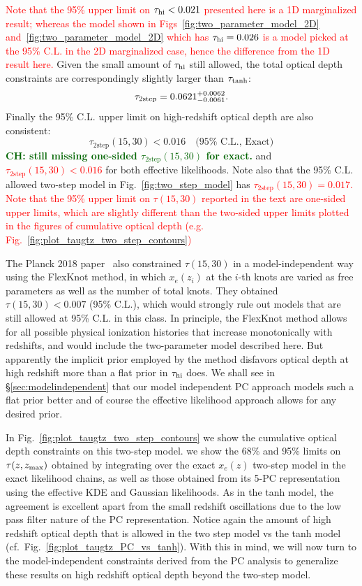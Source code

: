 \documentclass[prd,twocolumn,amsmath,amssymb,floatfix,superscriptaddress,nofootinbib]{revtex4-1}
\newcommand{\zmax}{z_{\rm max}}
\newcommand{\tauhi}{\tau_{\rm hi}}
\newcommand{\beq}{\begin{equation}}
\newcommand{\eeq}{\end{equation}}
\newcommand{\ch}[1]{\textcolor{red}{#1}}
\newcommand{\todo}[1]{\textcolor{darkgreen}{\bf{#1}}}
\begin{document}
\ch{Note that the 95\% upper limit on $\tau_{\rm hi} < 0.021$ presented here is a 1D marginalized result; whereas the model shown in Figs~\ref{fig:two_parameter_model_2D} and~\ref{fig:two_parameter_model_2D} which has $\tauhi = 0.026$ is a model picked at the 95\% C.L. in the 2D marginalized case, hence the difference from the 1D result here.}
Given the small amount of $\tau_{\rm hi}$ still allowed, the total optical depth constraints are correspondingly slightly larger than $\tau_{\rm tanh}$:
\ch{
\beq
\tau_{\rm 2step} = 0.0621^{+0.0062}_{-0.0061}.
\eeq
}
Finally the 95\% C.L. upper limit on high-redshift optical depth are also consistent:
\begin{equation}
    \tau_{2\text{step}}(15, 30) < 0.016 \quad (95\% \text{ C.L., Exact)}
    \label{eq:2stepbound}
\end{equation}
\todo{CH: still missing one-sided $\tau_{2\text{step}}(15, 30)$ for exact.}
and 
\ch{$\tau_{2\text{step}}(15, 30) < 0.016$} for both effective likelihoods. %
Note also that the 95\% C.L. allowed two-step model in 
Fig.~\ref{fig:two_step_model} has
\ch{$\tau_{2\text{step}}(15,30)= 0.017$.}
\ch{Note that the 95\% upper limit on $\tau(15, 30)$ reported in the text are one-sided upper limits, which are slightly different than the two-sided upper limits plotted in the figures of cumulative optical depth (e.g. Fig.~\ref{fig:plot_taugtz_two_step_contours})}

The Planck 2018 paper~\cite{Aghanim:2018eyx} also constrained $\tau(15, 30)$ in a model-independent way using the FlexKnot method, in which $x_e(z_i)$ at the $i$-th knots are varied as free parameters as well as the number of total knots. They obtained $\tau(15, 30) < 0.007$ (95\% C.L.), which would strongly rule out models that are still allowed at 95\% C.L. in this class. 
 In principle, the FlexKnot method allows for all possible physical ionization histories that increase monotonically with redshifts, and would include the two-parameter model described here. But apparently the implicit prior employed by the method disfavors optical depth at high redshift more than a flat prior in 
$\tau_{\rm hi}$ does.  We shall see in \S \ref{sec:modelindependent} that our model independent PC approach models such a flat prior better and of course the effective likelihood approach allows for any desired prior.


In Fig.~\ref{fig:plot_taugtz_two_step_contours} we show the cumulative optical depth constraints on this two-step model. we show the 68\% and 95\% limits on $\tau(z, \zmax)$ obtained by integrating over the exact $x_e(z)$ two-step model in the exact likelihood chains, as well as those obtained from its 5-PC representation using the effective KDE and Gaussian likelihoods.   
As in the tanh model, the agreement is excellent apart from the small redshift oscillations due to the low pass filter nature of the PC representation.  Notice again the amount of high redshift optical depth that is allowed in the two step model vs the tanh model (cf.~Fig.~\ref{fig:plot_taugtz_PC_vs_tanh}).
With this in mind, we will now turn to the model-independent constraints derived from the PC analysis to generalize these results on high redshift optical depth beyond the two-step model.
\end{document}
